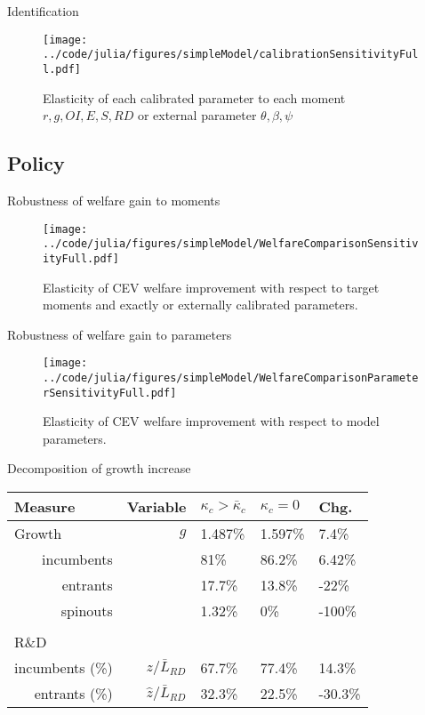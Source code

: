\documentclass[english,usenames,dvipsnames]{beamer}
\begin{document}
\begin{frame}{Identification}\label{identification}\hyperlink{parameters}{} 
	\begin{figure}
		\texttt{[image: ../code/julia/figures/simpleModel/calibrationSensitivityFull.pdf]}
		\caption{\small Elasticity of each calibrated parameter to each moment $r,g,OI,E,S,RD$ or external parameter $\theta, \beta, \psi$}
	\end{figure}
\end{frame}


\subsection{Policy}


\begin{frame}{Robustness of welfare gain to moments}\label{robustness_to_moments}
\hyperlink{reducing_kappa_c_table}{}
	\begin{figure}
		\texttt{[image: ../code/julia/figures/simpleModel/WelfareComparisonSensitivityFull.pdf]}
		\caption{Elasticity of CEV welfare improvement with respect to target moments and exactly or externally calibrated parameters.}
		\label{WelfareComparisonSensitivityFull}
	\end{figure}
\end{frame}

\begin{frame}{Robustness of welfare gain to parameters}\label{robustness_to_parameters}
	\hyperlink{reducing_kappa_c_table}{}
	\begin{figure}
		\texttt{[image: ../code/julia/figures/simpleModel/WelfareComparisonParameterSensitivityFull.pdf]}
		\caption{Elasticity of CEV welfare improvement with respect to model parameters.}
		\label{WelfareComparisonSensitivityFull}
	\end{figure}
\end{frame}

\begin{frame}{Decomposition of growth increase}\label{decomposition_growth_increase}
	\hyperlink{reducing_kappa_c_table}{}
	\begin{table}
		\centering
		\footnotesize
		\begin{tabular}{lrlll}
			\toprule \toprule
			Measure & Variable & $\kappa_c > \bar{\kappa}_c$ & $\kappa_c = 0$ & Chg. \tabularnewline
			\midrule
			Growth & $g$ & 1.487\% & 1.597\% & 7.4\% \tabularnewline
			\multicolumn{1}{r}{incumbents} &  & 81\% & 86.2\% & 6.42\% \tabularnewline
			\multicolumn{1}{r}{entrants} &  & 17.7\% & 13.8\% & -22\% \tabularnewline
			\multicolumn{1}{r}{spinouts} &  & 1.32\% & 0\% & -100\% \tabularnewline
			\tabularnewline
			R\&D & & & & 
			\tabularnewline
			\multicolumn{1}{r}{incumbents (\%)}  & $z / \bar{L}_{RD}$ & 67.7\% & 77.4\% & 14.3\% \tabularnewline 
			
			\multicolumn{1}{r}{entrants (\%)}  & $\hat{z} / \bar{L}_{RD}$ & 32.3\% & 22.5\% & -30.3\% \tabularnewline
			\bottomrule
		\end{tabular}
	\end{table}
\end{frame}
\end{document}
